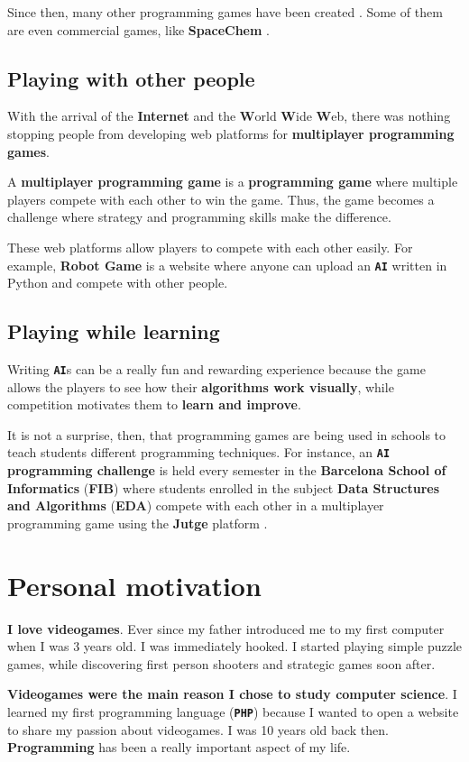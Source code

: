 \documentclass[a4paper,11pt,titlepage,abstract,numbers=noenddot,automark,mnsy,intlimits,rgb,dvipsnames]{report}
\begin{document}
Since then, many other programming games have been created \cite{pg}. Some of them are even commercial games, like
\textbf{SpaceChem} \cite{spacechem}.
\subsection{Playing with other people}
With the arrival of the \textbf{Internet} and the \textbf{W}orld \textbf{W}ide \textbf{W}eb, there was nothing stopping people from
developing web platforms for \textbf{multiplayer programming games}.

A \textbf{multiplayer programming game} is a \textbf{programming game} where multiple players compete with each other to win the
game. Thus, the game becomes a challenge where strategy and programming skills make the difference.

These web platforms allow players to compete with each other easily. For example, \textbf{Robot Game}
\cite{robotgame} is a website where anyone can upload an \textbf{\texttt{AI}} written in \texttt{}Python\texttt{} and compete with other people.
\subsection{Playing while learning}
Writing \textbf{\texttt{AI}}s can be a really fun and rewarding experience because the game allows the players to see how their
\textbf{algorithms work visually}, while competition motivates them to \textbf{learn and improve}.

It is not a surprise, then, that programming games are being used in schools to teach students different programming
techniques. For instance, an \textbf{\texttt{AI} programming challenge} is held every semester in the \textbf{Barcelona School of
Informatics} (\textbf{FIB}) where students enrolled in the subject \textbf{Data Structures and Algorithms} (\textbf{EDA}) \cite{eda}
compete with each other in a multiplayer programming game using the \textbf{Jutge} platform \cite{jutge}.
\section{Personal motivation}
\textbf{I love videogames}. Ever since my father introduced me to my first computer when I was 3 years old.
I was immediately hooked. I started playing simple puzzle games, while discovering first person shooters and strategic
games soon after.

\textbf{Videogames were the main reason I chose to study computer science}. I learned my first
programming language (\textbf{\texttt{PHP}}) because I wanted to open a website
to share my passion about videogames. I was 10 years old back then. \textbf{Programming} has been a really important
aspect of my life.
\end{document}
